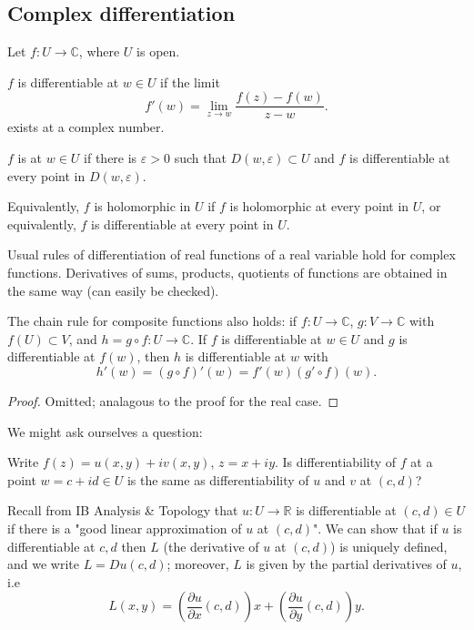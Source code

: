 \documentclass[egregdoesnotlikesansseriftitles,a4paper]{scrartcl}
\begin{document}
\subsection{Complex differentiation}
Let $f: U \rightarrow \mathbb{C}$, where $U$ is open. 
\begin{definition*}[Differentiability]
     $f$ is differentiable at $w \in U$ if the limit \[
     f' (w)=\lim_{z \rightarrow w} \frac{f (z)-f (w)}{z-w}
     .\] exists at a complex number.
\end{definition*}
\begin{definition*}
     $f$ is \footnotemark at $w \in U$ if there is $\varepsilon >0$ such that $D (w, \varepsilon)\subset U$ and $f$ is differentiable at every point in $D (w, \varepsilon)$. 

     Equivalently, $f$ is holomorphic in $U$ if $f$ is holomorphic at every point in $U$, or equivalently, $f$ is differentiable at every point in $U$.
\end{definition*}
Usual rules of differentiation of real functions of a real variable hold for complex functions. Derivatives of sums, products, quotients of functions are obtained in the same way (can easily be checked). 

\begin{proposition}
     The chain rule for composite functions also holds: if $f: U \rightarrow \mathbb{C}$, $g: V \rightarrow \mathbb{C}$ with $f (U) \subset V$, and $h= g \circ f : U \rightarrow \mathbb{C}$. If $f$ is differentiable at $w \in U$ and $g$ is differentiable at $f (w)$, then $h$ is differentiable at $w$ with \[
     h' (w)=(g \circ f)' (w)= f' (w) (g' \circ f)(w)
     .\] 
\end{proposition}
\begin{proof}
     Omitted; analagous to the proof for the real case.
\end{proof}
We might ask ourselves a question: 

Write $f (z)= u (x,y)+iv (x,y)$, $z=x+iy$. Is differentiability of $f$ at a point $w=c+id \in U$ is the same as differentiability of $u $ and $v$ at $(c,d)$? 

Recall from IB Analysis \& Topology that $u : U \rightarrow \mathbb{R}$ is differentiable at $(c,d) \in U$ if there is a "good linear approximation of $u$ at $(c,d)$". We can show that if  $u$ is differentiable at $c,d$ then $L$ (the derivative of $u$ at $(c,d)$) is uniquely defined, and we write $L=Du (c,d)$; moreover, $L$ is given by the partial derivatives of $u$, i.e \[
L (x,y)= \left(\frac{\partial u}{\partial x} (c,d)\right)x + \left( \frac{\partial u}{\partial y}(c,d)\right)y
.\]  
\end{document}
